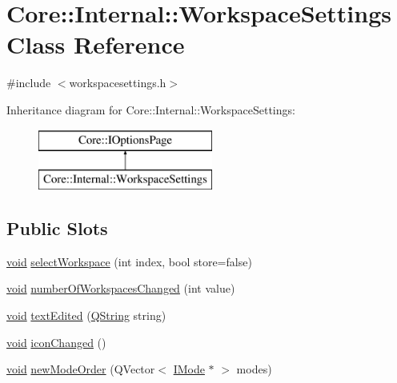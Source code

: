 \hypertarget{class_core_1_1_internal_1_1_workspace_settings}{\section{\-Core\-:\-:\-Internal\-:\-:\-Workspace\-Settings \-Class \-Reference}
\label{class_core_1_1_internal_1_1_workspace_settings}
}


{\ttfamily \#include $<$workspacesettings.\-h$>$}

\-Inheritance diagram for \-Core\-:\-:\-Internal\-:\-:\-Workspace\-Settings\-:\begin{figure}[H]
\begin{center}
\leavevmode
\includegraphics[height=2.000000cm]{class_core_1_1_internal_1_1_workspace_settings}
\end{center}
\end{figure}
\subsection*{\-Public \-Slots}
\begin{DoxyCompactItemize}
\item 
\hyperlink{group___u_a_v_objects_plugin_ga444cf2ff3f0ecbe028adce838d373f5c}{void} \hyperlink{group___core_plugin_ga8421af99280f278e01011e47fcb1a386}{select\-Workspace} (int index, bool store=false)
\item 
\hyperlink{group___u_a_v_objects_plugin_ga444cf2ff3f0ecbe028adce838d373f5c}{void} \hyperlink{group___core_plugin_ga1575cedbcfaf5b3074eec04fbfc5b9a8}{number\-Of\-Workspaces\-Changed} (int value)
\item 
\hyperlink{group___u_a_v_objects_plugin_ga444cf2ff3f0ecbe028adce838d373f5c}{void} \hyperlink{group___core_plugin_gadd1f5f6b07432b1f0ce05a0f32d2e167}{text\-Edited} (\hyperlink{group___u_a_v_objects_plugin_gab9d252f49c333c94a72f97ce3105a32d}{\-Q\-String} string)
\item 
\hyperlink{group___u_a_v_objects_plugin_ga444cf2ff3f0ecbe028adce838d373f5c}{void} \hyperlink{group___core_plugin_ga5325701713e8d0b8f192ceb394317831}{icon\-Changed} ()
\item 
\hyperlink{group___u_a_v_objects_plugin_ga444cf2ff3f0ecbe028adce838d373f5c}{void} \hyperlink{group___core_plugin_ga5c72de6d843864da76c1725b05bd7382}{new\-Mode\-Order} (\-Q\-Vector$<$ \hyperlink{class_core_1_1_i_mode}{\-I\-Mode} $\ast$ $>$ modes)
\end{DoxyCompactItemize}
